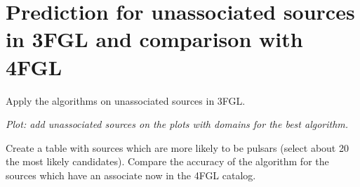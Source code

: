 \section{Prediction for unassociated sources in 3FGL and comparison with 4FGL}

Apply the algorithms on unassociated sources in 3FGL.

{\it Plot: add unassociated sources on the plots with domains for the best algorithm.}

Create a table with sources which are more likely to be pulsars (select about 20 the most likely candidates).
Compare the accuracy of the algorithm for the sources which have an associate now in the 4FGL catalog.

